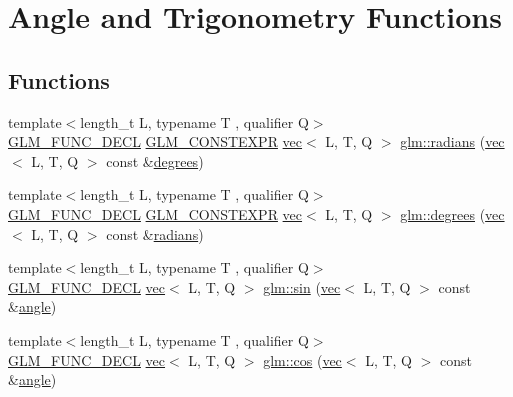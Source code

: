 \hypertarget{group__core__func__trigonometric}{}\section{Angle and Trigonometry Functions}
\label{group__core__func__trigonometric}
\subsection*{Functions}
\begin{DoxyCompactItemize}
\item 
{\footnotesize template$<$length\+\_\+t L, typename T , qualifier Q$>$ }\\\mbox{\hyperlink{setup_8hpp_ab2d052de21a70539923e9bcbf6e83a51}{G\+L\+M\+\_\+\+F\+U\+N\+C\+\_\+\+D\+E\+CL}} \mbox{\hyperlink{setup_8hpp_a08b807947b47031d3a511f03f89645ad}{G\+L\+M\+\_\+\+C\+O\+N\+S\+T\+E\+X\+PR}} \mbox{\hyperlink{structglm_1_1vec}{vec}}$<$ L, T, Q $>$ \mbox{\hyperlink{group__core__func__trigonometric_ga6e1db4862c5e25afd553930e2fdd6a68}{glm\+::radians}} (\mbox{\hyperlink{structglm_1_1vec}{vec}}$<$ L, T, Q $>$ const \&\mbox{\hyperlink{namespaceglm_a8a6fe45ac1da0ac1023bab706a675413}{degrees}})
\item 
{\footnotesize template$<$length\+\_\+t L, typename T , qualifier Q$>$ }\\\mbox{\hyperlink{setup_8hpp_ab2d052de21a70539923e9bcbf6e83a51}{G\+L\+M\+\_\+\+F\+U\+N\+C\+\_\+\+D\+E\+CL}} \mbox{\hyperlink{setup_8hpp_a08b807947b47031d3a511f03f89645ad}{G\+L\+M\+\_\+\+C\+O\+N\+S\+T\+E\+X\+PR}} \mbox{\hyperlink{structglm_1_1vec}{vec}}$<$ L, T, Q $>$ \mbox{\hyperlink{group__core__func__trigonometric_ga8faec9e303538065911ba8b3caf7326b}{glm\+::degrees}} (\mbox{\hyperlink{structglm_1_1vec}{vec}}$<$ L, T, Q $>$ const \&\mbox{\hyperlink{namespaceglm_a00577ee752441c79d5bb11d7c29e1627}{radians}})
\item 
{\footnotesize template$<$length\+\_\+t L, typename T , qualifier Q$>$ }\\\mbox{\hyperlink{setup_8hpp_ab2d052de21a70539923e9bcbf6e83a51}{G\+L\+M\+\_\+\+F\+U\+N\+C\+\_\+\+D\+E\+CL}} \mbox{\hyperlink{structglm_1_1vec}{vec}}$<$ L, T, Q $>$ \mbox{\hyperlink{group__core__func__trigonometric_ga29747fd108cb7292ae5a284f69691a69}{glm\+::sin}} (\mbox{\hyperlink{structglm_1_1vec}{vec}}$<$ L, T, Q $>$ const \&\mbox{\hyperlink{_s_d_l__opengl__glext_8h_a9e06c1f76a20fed54ca742cd25cb02c4}{angle}})
\item 
{\footnotesize template$<$length\+\_\+t L, typename T , qualifier Q$>$ }\\\mbox{\hyperlink{setup_8hpp_ab2d052de21a70539923e9bcbf6e83a51}{G\+L\+M\+\_\+\+F\+U\+N\+C\+\_\+\+D\+E\+CL}} \mbox{\hyperlink{structglm_1_1vec}{vec}}$<$ L, T, Q $>$ \mbox{\hyperlink{group__core__func__trigonometric_ga6a41efc740e3b3c937447d3a6284130e}{glm\+::cos}} (\mbox{\hyperlink{structglm_1_1vec}{vec}}$<$ L, T, Q $>$ const \&\mbox{\hyperlink{_s_d_l__opengl__glext_8h_a9e06c1f76a20fed54ca742cd25cb02c4}{angle}})

\end{DoxyCompactItemize}
